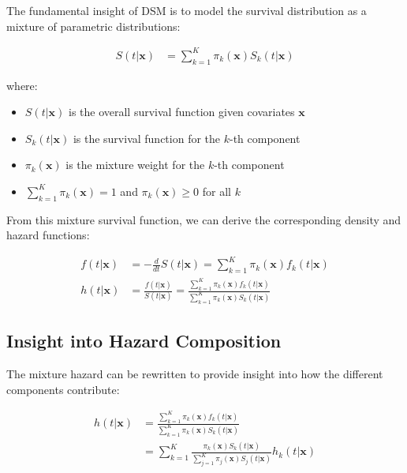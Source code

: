 The fundamental insight of DSM is to model the survival distribution as a mixture of parametric distributions:

\begin{equationbox}[title=DSM Mixture Survival Function]
\begin{align}
    S(t|\mathbf{x}) &= \sum_{k=1}^{K} \pi_k(\mathbf{x}) S_k(t|\mathbf{x})
\end{align}

where:
\begin{itemize}
    \item $S(t|\mathbf{x})$ is the overall survival function given covariates $\mathbf{x}$
    \item $S_k(t|\mathbf{x})$ is the survival function for the $k$-th component
    \item $\pi_k(\mathbf{x})$ is the mixture weight for the $k$-th component
    \item $\sum_{k=1}^K \pi_k(\mathbf{x}) = 1$ and $\pi_k(\mathbf{x}) \geq 0$ for all $k$
\end{itemize}
\end{equationbox}

From this mixture survival function, we can derive the corresponding density and hazard functions:

\begin{equationbox}[title=DSM Mixture Density and Hazard]
\begin{align}
    f(t|\mathbf{x}) &= -\frac{d}{dt}S(t|\mathbf{x}) = \sum_{k=1}^{K} \pi_k(\mathbf{x}) f_k(t|\mathbf{x}) \\
    h(t|\mathbf{x}) &= \frac{f(t|\mathbf{x})}{S(t|\mathbf{x})} = \frac{\sum_{k=1}^{K} \pi_k(\mathbf{x}) f_k(t|\mathbf{x})}{\sum_{k=1}^{K} \pi_k(\mathbf{x}) S_k(t|\mathbf{x})}
\end{align}
\end{equationbox}

\subsection{Insight into Hazard Composition}

The mixture hazard can be rewritten to provide insight into how the different components contribute:

\begin{equationbox}[title=Alternative Hazard Formulation]
\begin{align}
    h(t|\mathbf{x}) &= \frac{\sum_{k=1}^{K} \pi_k(\mathbf{x}) f_k(t|\mathbf{x})}{\sum_{k=1}^{K} \pi_k(\mathbf{x}) S_k(t|\mathbf{x})} \\
    &= \sum_{k=1}^{K} \frac{\pi_k(\mathbf{x}) S_k(t|\mathbf{x})}{\sum_{j=1}^{K} \pi_j(\mathbf{x}) S_j(t|\mathbf{x})} h_k(t|\mathbf{x})
\end{align}
\end{equationbox}

